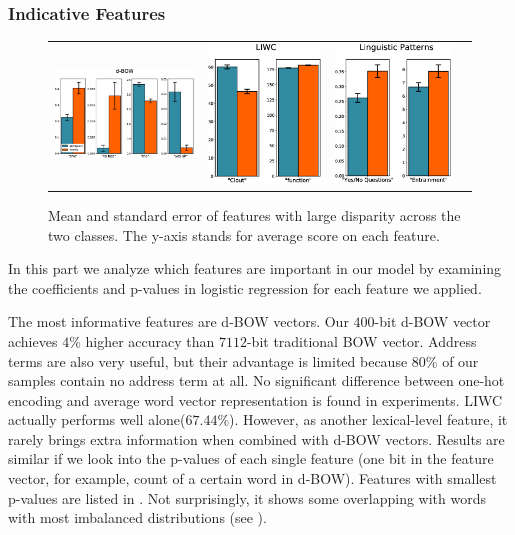 \subsubsection*{Indicative Features}
\begin{figure}[th!]
	\centering
	\begin{tabular}{@{}cccc@{}}
		\includegraphics[width=.464\textwidth]{d-bow.eps} &
		\includegraphics[width=.24\textwidth]{liwc.eps} &
		\includegraphics[width=.248\textwidth]{lp.eps} 
	\end{tabular}
	\caption{Mean and standard error of features with large disparity
		across the two classes. The y-axis stands for average score on each feature.} \label{fig:compare}
\end{figure}
In this part we analyze which features are important in our model by examining the coefficients 
and p-values in logistic regression for each feature we applied. 

The most informative features are d-BOW vectors. Our $400$-bit d-BOW vector achieves $4\%$ higher accuracy than $7112$-bit traditional BOW vector.
Address terms are also very useful,  
but their advantage is limited because $80\%$ of our samples contain 
no address term at all. No significant difference between one-hot encoding and average word vector representation is found in experiments.
LIWC actually performs well alone($67.44\%$). However, 
as another lexical-level feature, it rarely brings extra information 
when combined with d-BOW vectors. Results are similar 
if we look into the p-values of each single feature (one bit in 
the feature vector, for example, count of a certain word in d-BOW). 
Features with smallest p-values are listed in . Not surprisingly, it shows some overlapping with words with most imbalanced distributions (see ).


